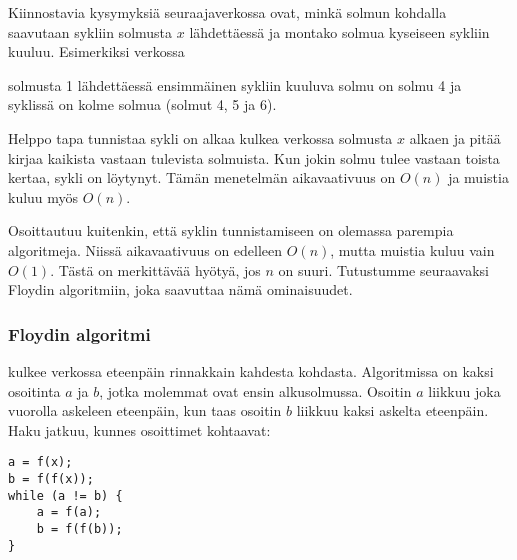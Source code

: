 
Kiinnostavia kysymyksiä seuraajaverkossa ovat,
minkä solmun kohdalla saavutaan sykliin
solmusta $x$ lähdettäessä
ja montako solmua kyseiseen sykliin kuuluu.
Esimerkiksi verkossa

\begin{center}
\end{center}
solmusta 1 lähdettäessä ensimmäinen sykliin kuuluva
solmu on solmu 4 ja syklissä on kolme solmua
(solmut 4, 5 ja 6).

Helppo tapa tunnistaa sykli on alkaa kulkea verkossa
solmusta $x$ alkaen ja pitää kirjaa kaikista vastaan tulevista
solmuista. Kun jokin solmu tulee vastaan toista kertaa,
sykli on löytynyt. Tämän menetelmän aikavaativuus on $O(n)$
ja muistia kuluu myös $O(n)$.

Osoittautuu kuitenkin, että syklin tunnistamiseen on
olemassa parempia algoritmeja.
Niissä aikavaativuus on edelleen $O(n)$,
mutta muistia kuluu vain $O(1)$.
Tästä on merkittävää hyötyä, jos $n$ on suuri.
Tutustumme seuraavaksi Floydin algoritmiin,
joka saavuttaa nämä ominaisuudet.

\subsubsection{Floydin algoritmi}


 kulkee verkossa eteenpäin rinnakkain
kahdesta kohdasta.
Algoritmissa on kaksi osoitinta $a$ ja $b$,
jotka molemmat ovat ensin alkusolmussa.
Osoitin $a$ liikkuu joka vuorolla askeleen eteenpäin,
kun taas osoitin $b$ liikkuu kaksi askelta eteenpäin.
Haku jatkuu, kunnes osoittimet kohtaavat:

\begin{lstlisting}
a = f(x);
b = f(f(x));
while (a != b) {
    a = f(a);
    b = f(f(b));
}
\end{lstlisting}


